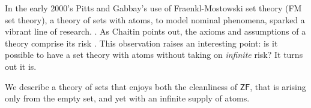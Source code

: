 \documentclass[12pt]{llncs}
\begin{document}
\lstset{language=[Objective]Caml,frame=shadowbox}




In the early 2000's Pitts and Gabbay's use of Fraenkl-Mostowski set
theory (FM set theory), a theory of sets with atoms, to model nominal phenomena,
sparked a vibrant line of research. \cite{DBLP:journals/fac/GabbayP02}
\cite{DBLP:journals/jcss/Clouston14}. As Chaitin points out, the
axioms and assumptions of a theory comprise its risk
\cite{chaitin1999unknowable}. This observation raises an interesting
point: is it possible to have a set theory with atoms without taking
on \emph{infinite} risk? It turns out it is.

We describe a theory of sets that enjoys both the cleanliness of
$\mathsf{ZF}$, that is arising only from the empty set, and yet with
an infinite supply of atoms.









   

\end{document}
